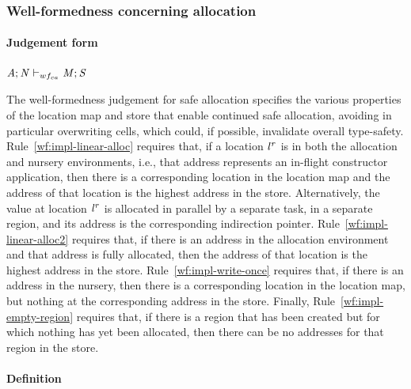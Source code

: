\subsubsection{Well-formedness concerning allocation}
\label{sec:well-formedness-allocation}

\paragraph{Judgement form}

$\mathit{A};\mathit{N} \vdash_{wf_{ca}} \mathit{M};\mathit{S}$

The well-formedness judgement for safe allocation specifies the various properties
of the location map and store that enable continued safe allocation, avoiding in particular
overwriting cells, which could, if possible, invalidate overall type-safety.
%
Rule~\ref{wf:impl-linear-alloc} requires that, if a location ${\mathit{l}}^{\mathit{r}}$ is in both the allocation
and nursery environments, i.e., that address represents an in-flight
constructor application, then there is a corresponding location in the location
map and the address of that location is the highest address in the store.
%
Alternatively, the value at location ${\mathit{l}}^{\mathit{r}}$ is allocated in parallel by
a separate task, in a separate region,
and its address is the corresponding indirection pointer.
%
Rule~\ref{wf:impl-linear-alloc2} requires that, if there is an address in the allocation
environment and that address is fully allocated, then the address of that location is the
highest address in the store.
%
Rule~\ref{wf:impl-write-once} requires that, if there is an address in the nursery, then
there is a corresponding location in the location map, but nothing at the corresponding
address in the store.
%
Finally, Rule~\ref{wf:impl-empty-region} requires that, if there is a region that has been
created but for which nothing has yet been allocated, then there can be no addresses
for that region in the store.

\paragraph{Definition}

